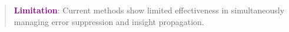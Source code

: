 \documentclass[11pt]{article}
\begin{document}
\begin{abstract}
\begin{tcolorbox}[
    enhanced, %
    colback=white, %
    colframe=purple, %
    boxrule=1pt, %
    arc=5pt, %
    left=5pt, right=5pt, %
    top=5pt, bottom=5pt, %
    width=\linewidth %
]
\textcolor{purple}{\textbf{Limitation}}: Current methods show limited effectiveness in simultaneously managing error suppression and insight propagation. %
\end{tcolorbox}



\end{abstract}
\end{document}
